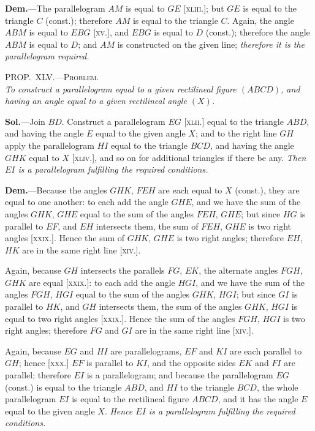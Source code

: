 \documentclass[oneside]{book}
\newcommand\myprop[2]{
\bigskip\Needspace*{4\baselineskip}\begin{center}\textsc{#1}\\\medskip\emph{#2}\par\end{center}
}
\newcommand\imgcent[2]{
\begin{center}
\end{center}
}
\begin{document}
\textbf{Dem.}---The parallelogram $AM$ is equal to $GE$
[\textsc{xliii}.]; but $GE$ is equal to the triangle $C$ (const.);
therefore $AM$ is equal to the triangle $C$. Again, the
angle $ABM$ is equal to $EBG$ [\textsc{xv}.], and $EBG$ is equal
to $D$ (const.); therefore the angle $ABM$ is equal to $D$;
and $AM$ is constructed on the given line; \emph{therefore it is
the parallelogram required.}



\myprop{PROP\@.~XLV\@.---Problem.}{To construct a parallelogram equal to a given rectilineal
figure $(ABCD)$, and having an angle equal to a given rectilineal angle $(X)$.}

\imgcent{230}{f067}

\textbf{Sol.}---Join $BD$. Construct a parallelogram $EG$
[\textsc{xlii.}] equal to the triangle $ABD$, and having the
angle $E$ equal to the given angle $X$; and to the right
line $GH$ apply the parallelogram $HI$ equal to the triangle
$BCD$, and having the angle $GHK$ equal to $X$
[\textsc{xliv.}], and so on for additional triangles if there be
any. \textit{Then $EI$ is a parallelogram fulfilling the required
conditions.}

\textbf{Dem.}---Because the angles $GHK$, $FEH$ are each
equal to $X$ (const.), they are equal to one another: to
each add the angle $GHE$, and we have the sum of the
angles $GHK$, $GHE$ equal to the sum of the angles
$FEH$, $GHE$; but since $HG$ is parallel to $EF$, and $EH$
intersects them, the sum of $FEH$, $GHE$ is two right
angles [\textsc{xxix.}]. Hence the sum of $GHK$, $GHE$ is two
right angles; therefore $EH$, $HK$ are in the same right
line [\textsc{xiv.}].

Again, because $GH$ intersects the parallels $FG$, $EK$,
the alternate angles $FGH$, $GHK$ are equal [\textsc{xxix.}]: to
each add the angle $HGI$, and we have the sum of the
angles $FGH$, $HGI$ equal to the sum of the angles $GHK$,
$HGI$; but since $GI$ is parallel to $HK$, and $GH$ intersects
them, the sum of the angles $GHK$, $HGI$ is equal
to two right angles [\textsc{xxix.}]. Hence the sum of the
angles $FGH$, $HGI$ is two right angles; therefore $FG$
and $GI$ are in the same right line [\textsc{xiv}.].

Again, because $EG$ and $HI$ are parallelograms, $EF$
and $KI$ are each parallel to $GH$; hence [\textsc{xxx}.] $EF$ is
parallel to $KI$, and the opposite sides $EK$ and $FI$ are
parallel; therefore $EI$ is a parallelogram; and because
the parallelogram $EG$ (const.) is equal to the triangle
$ABD$, and $HI$ to the triangle $BCD$, the whole parallelogram
$EI$ is equal to the rectilineal figure $ABCD$, and
it has the angle $E$ equal to the given angle $X$. \emph{Hence
$EI$ is a parallelogram fulfilling the required conditions.}\par\medskip
\end{document}
